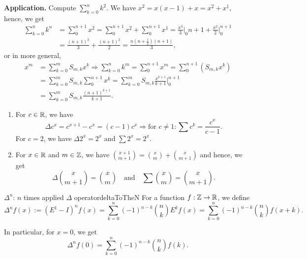 \documentclass[language=english]{../../Template/TemplateLecture}
\begin{document}
\textbf{Application.} Compute $\sum_{k = 0}^n k^2$. We have $x^2 = x(x-1) + x = x^{\underline{2}} + x^{\underline{1}}$, hence, we get 
\begin{equation}
    \begin{split}
        \sum_{k = 0}^n k^n &= \sum_0^{n+1} x^2 = \sum_0^{n+1} x^{\underline{2}} + \sum_0^{n+1} x^{\underline{1}} = \frac{x^{\underline{3}}}{3}\Big|_0{n+1} + \frac{x^{\underline{2}}}{2}\Big|_0^{n+1} \\
        &= \frac{(n+1)^{\underline{3}}}{3} + \frac{(n+1)^{\underline{2}}}{2} = \frac{n\left(n + \frac{1}{2}\right)(n+1)}{3},
    \end{split}
\end{equation}
or in more general,
\begin{equation}
    \begin{split}
        x^m &= \sum_{k = 0}^m S_{m,k} x^{\underline{k}} \Rightarrow \sum_{k = 0}^n k^m = \sum_0^{n+1} x^m = \sum_0^{n+1}\left(S_{m,k}x^{\underline{k}}\right) \\
        &= \sum_{k = 0}^m S_{m,k} \sum_0^{n+1} x^{\underline{k}} = \sum_{k = 0}^m S_{m,k} \frac{x^{\underline{k+1}}}{k+1}\Big|_0^{n+1}\\
        &= \sum_{k = 0}^m S_{m,k} \frac{(n+1)^{\underline{k+1}}}{k+1}.
    \end{split}
\end{equation}

\begin{beispiel}
    \begin{enumerate}[$(i)$]
        \item For $c \in \mathbb{R}$, we have 
        \begin{equation}
            \Delta c^x = c^{x+1} - c^x = (c-1)c^x \Rightarrow \text{for } c \neq 1: \sum c^k = \frac{c^x}{c-1}.
        \end{equation}
        For $c = 2$, we have $\Delta 2^x = 2^x$ and $\sum 2^x = 2^x$.
        \item For $x \in \mathbb{R}$ and $m \in \mathbb{Z}$, we have $\binom{x+1}{m+1} =\binom{x}{m} + \binom{x}{m+1}$ and hence, we get 
        \begin{equation}
            \Delta \binom{x}{m+1} = \binom{x}{m} \quad \text{and} \quad \sum \binom{x}{m} = \binom{x}{m+1}.
        \end{equation}
    \end{enumerate}
\end{beispiel}

\begin{defi}{$\Delta^n$: $n$ times applied $\Delta$ operator}{deltaToTheN}
    For a function $f: \mathbb{Z} \to \mathbb{R}$, we define
    \begin{equation}
        \Delta^n f(x) := (E^1 - I)^n f(x) = \sum_{k = 0}^n (-1)^{n-k} \binom{n}{k} E^k f(x) = \sum_{k = 0}^n (-1)^{n-k} \binom{n}{k} f(x + k).
    \end{equation}
\end{defi}
In particular, for $x = 0$, we get
\begin{equation}
    \Delta^n f(0) = \sum_{k = 0}^n (-1)^{n-k} \binom{n}{k} f(k). \label{eq:deltaNOf0}
\end{equation} 
\end{document}

